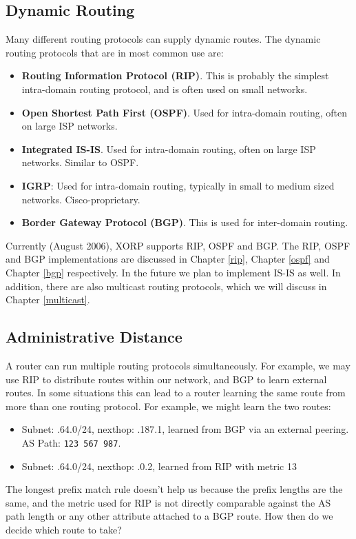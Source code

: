 \subsection{Dynamic Routing}

Many different routing protocols can supply dynamic routes.  The dynamic
routing protocols that are in most common use are:
\begin{itemize}
\item {\bf Routing Information Protocol (RIP)}.  This is probably the
simplest intra-domain routing protocol, and is often used on small
networks.
\item {\bf Open Shortest Path First (OSPF)}.  Used for intra-domain routing,
often on large ISP networks.
\item {\bf Integrated IS-IS}.  Used for intra-domain routing, often
on large ISP networks.  Similar to OSPF.
\item {\bf IGRP}: Used for intra-domain routing, typically in small to
medium sized networks.  Cisco-proprietary.
\item {\bf Border Gateway Protocol (BGP)}.  This is used for
inter-domain routing.
\end{itemize}
Currently (August 2006), XORP supports RIP, OSPF and BGP.
The RIP, OSPF and BGP implementations are discussed in Chapter \ref{rip},
Chapter \ref{ospf} and Chapter \ref{bgp} respectively.
In the future we plan to implement IS-IS as well.
In addition, there are also multicast routing protocols, which we will
discuss in Chapter \ref{multicast}.

\subsection{Administrative Distance}

A router can run multiple routing protocols simultaneously.  For
example, we may use RIP to distribute routes within our network, and
BGP to learn external routes.  In some situations this can lead to a
router learning the same route from more than one routing protocol.
For example, we might learn the two routes:
\begin{itemize}
\item Subnet: {.64.0/24}, nexthop: {.187.1},
learned from BGP via an external peering. AS Path: {\tt 123 567 987}.
\item Subnet: {.64.0/24}, nexthop: {.0.2}, learned
from RIP with metric 13
\end{itemize}
The longest prefix match rule doesn't help us because the prefix
lengths are the same, and the metric used for RIP is not directly
comparable against the AS path length or any other attribute attached
to a BGP route.  How then do we decide which route to take?

